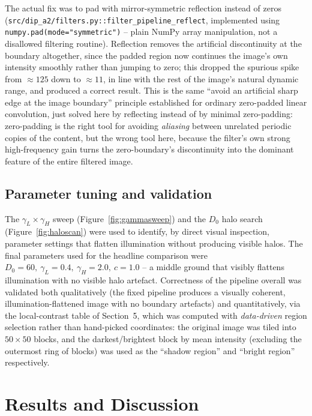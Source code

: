\documentclass[11pt]{article}
\begin{document}
The actual fix was to pad with mirror-symmetric reflection instead of zeros
(\texttt{src/dip\_a2/filters.py::filter\_pipeline\_reflect}, implemented using
\texttt{numpy.pad(mode="symmetric")} -- plain NumPy array manipulation, not a disallowed
filtering routine). Reflection removes the artificial discontinuity at the boundary
altogether, since the padded region now continues the image's own intensity smoothly
rather than jumping to zero; this dropped the spurious spike from $\approx 125$ down to
$\approx 11$, in line with the rest of the image's natural dynamic range, and produced a
correct result. This is the same ``avoid an artificial sharp edge at the image boundary''
principle established for ordinary zero-padded linear convolution, just solved here by
reflecting instead of by minimal zero-padding: zero-padding is the right tool for
avoiding \emph{aliasing} between unrelated periodic copies of the content, but the wrong
tool here, because the filter's own strong high-frequency gain turns the zero-boundary's
discontinuity into the dominant feature of the entire filtered image.

\subsection{Parameter tuning and validation}

The $\gamma_L\times\gamma_H$ sweep (Figure~\ref{fig:gammasweep}) and the $D_0$ halo
search (Figure~\ref{fig:haloscan}) were used to identify, by direct visual inspection,
parameter settings that flatten illumination without producing visible halos. The
final parameters used for the headline comparison were
$D_0=60,\ \gamma_L=0.4,\ \gamma_H=2.0,\ c=1.0$ -- a middle ground that visibly flattens
illumination with no visible halo artefact. Correctness of the pipeline overall was
validated both qualitatively (the fixed pipeline produces a visually coherent,
illumination-flattened image with no boundary artefacts) and quantitatively, via the
local-contrast table of Section~5, which was computed with \emph{data-driven} region
selection rather than hand-picked coordinates: the original image was tiled into
$50\times 50$ blocks, and the darkest/brightest block by mean intensity (excluding the
outermost ring of blocks) was used as the ``shadow region'' and ``bright region''
respectively.

\section{Results and Discussion}
\end{document}
